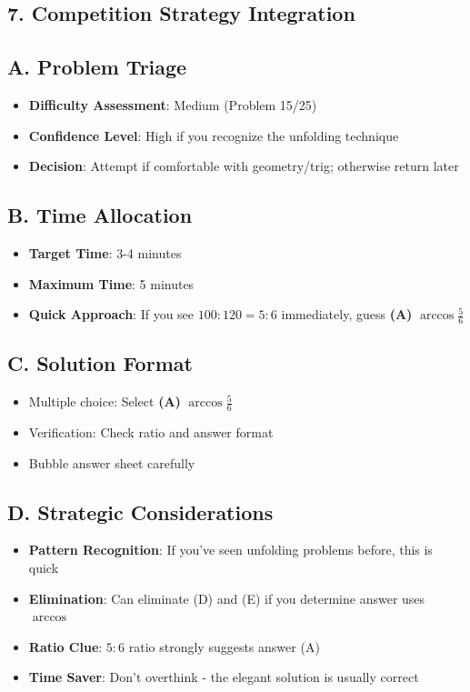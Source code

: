 \documentclass[11pt]{article}
\begin{document}
\begin{competitionbox}
\section*{7. Competition Strategy Integration}

\subsection*{A. Problem Triage}
\begin{itemize}[leftmargin=*]
    \item \textbf{Difficulty Assessment}: Medium (Problem 15/25)
    \item \textbf{Confidence Level}: High if you recognize the unfolding technique
    \item \textbf{Decision}: Attempt if comfortable with geometry/trig; otherwise return later
\end{itemize}

\subsection*{B. Time Allocation}
\begin{itemize}[leftmargin=*]
    \item \textbf{Target Time}: 3-4 minutes
    \item \textbf{Maximum Time}: 5 minutes
    \item \textbf{Quick Approach}: If you see $100:120 = 5:6$ immediately, guess \textbf{(A)} $\arccos\frac{5}{6}$
\end{itemize}

\subsection*{C. Solution Format}
\begin{itemize}[leftmargin=*]
    \item Multiple choice: Select \textbf{(A)} $\arccos\frac{5}{6}$
    \item Verification: Check ratio and answer format
    \item Bubble answer sheet carefully
\end{itemize}

\subsection*{D. Strategic Considerations}
\begin{itemize}[leftmargin=*]
    \item \textbf{Pattern Recognition}: If you've seen unfolding problems before, this is quick
    \item \textbf{Elimination}: Can eliminate (D) and (E) if you determine answer uses $\arccos$
    \item \textbf{Ratio Clue}: $5:6$ ratio strongly suggests answer (A)
    \item \textbf{Time Saver}: Don't overthink - the elegant solution is usually correct
\end{itemize}
\end{competitionbox}
\end{document}
